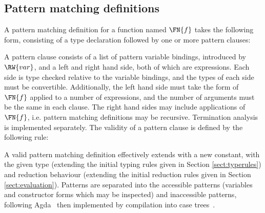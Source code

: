 \subsection{Pattern matching definitions}

\label{sect:patdefs}



A pattern matching definition for a function named $\FN{f}$ takes the following form,
consisting of a type declaration followed by one or more pattern clauses:


A pattern clause consists of a list of pattern variable bindings, introduced by
$\RW{var}$,
and a left and right hand side, both of which
are \TT{} expressions. Each side is type checked relative to the variable bindings,
and the types of each side must be convertible. Additionally, the
left hand side must take the form of $\FN{f}$ applied to a number of \TT{} expressions,
and the number of arguments must be the same in each clause. The right hand
sides may include applications of $\FN{f}$, i.e. pattern matching definitions may
be recursive. Termination analysis is implemented separately. The validity of a pattern
clause is defined by the following rule:


A valid pattern matching definition effectively extends \TT{} with a new
constant, with the given type (extending the initial typing rules given in
Section \ref{sect:typerules}) and reduction behaviour (extending the initial
reduction rules given in Section \ref{sect:evaluation}). 
Patterns are separated into the accessible patterns (variables and constructor
forms which may be inspected) and inaccessible patterns, following
Agda~\cite{norell2007thesis} then implemented by compilation into case
trees~\cite{Augustsson1985}.

